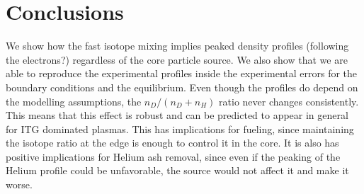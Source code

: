 \documentclass[a4paper,10pt]{iopart}
\begin{document}
\section{Conclusions}

We show how the fast isotope mixing implies peaked density profiles (following the electrons?) regardless of the core particle source. We also show that we are able to reproduce the experimental profiles inside the experimental errors for the boundary conditions and the equilibrium. Even though the profiles do depend on the modelling assumptions, the $ n_{D}/(n_{D}+n_{H}) $ ratio never changes consistently. This means that this effect is robust and can be predicted to appear in general for ITG dominated plasmas. 
This has implications for fueling, since maintaining the isotope ratio at the edge is enough to control it in the core. It is also has positive implications for Helium ash removal, since even if the peaking of the Helium profile could be unfavorable, the source would not affect it and make it worse. 





\singlespacing

%
\end{document}

